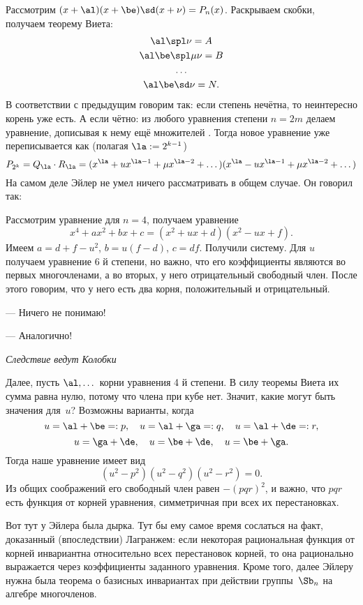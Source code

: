 \documentclass[a4paper,oneside,fleqn,10pt]{article}
\begin{document}
Рассмотрим $(x + \al)(x + \be)\sd(x+\nu) = P_n(x)$.
Раскрываем скобки, получаем теорему Виета:
\begin{gather*}
\al \spl \nu = A\\
\al\be \spl \mu\nu = B\\
\ldots\\
\al\be\sd\nu  = N.
\end{gather*}
В соответствии с предыдущим говорим так:
если степень нечётна, то неинтересно корень уже есть.
А если чётно: из любого уравнения степени $n = 2m$ делаем уравнение, дописывая
к нему ещё множителей . Тогда новое уравнение уже переписывается
как (полагая $\la := 2^{k-1}$)
$$
  P_{2^k} = Q_\la \cdot R_\la=
  (x^\la + u x^{\la-1} + \mu x^{\la-2} + \dots)(x^\la - u x^{\la-1} + \mu x^{\la-2}+\dots )
$$
На самом деле Эйлер не умел ничего рассматривать в общем случае. Он говорил так:

Рассмотрим уравнение для $n=4$, получаем уравнение
$$
  x^4 + ax^2 + bx + c = (x^2 + ux + d) (x^2 - ux + f).
$$
Имеем $a = d + f - u^2$, $b = u(f-d)$, $c = df$.
Получили систему. Для $u$ получаем уравнение 6 й степени, но важно, что его коэффициенты
являются во первых многочленами, а во вторых, у него отрицательный свободный член.
После этого говорим, что у него есть два корня, положительный и отрицательный.

\epigraph{\par--- Ничего не понимаю!
  \par --- Аналогично!}
{\emph{Следствие ведут Колобки}}

Далее, пусть $\al, \dots$ корни уравнения 4 й степени. В силу теоремы Виета их сумма равна нулю,
потому что члена при кубе нет. Значит, какие могут быть значения для~$u$?
Возможны варианты, когда
$$
u = \al + \be =:p,\quad
u = \al + \ga=:q,\quad
u = \al + \de=:r,
$$
$$
u = \ga + \de,\quad
u = \be + \de,\quad
u = \be + \ga.$$
Тогда наше уравнение
имеет вид
$$
  (u^2-p^2)(u^2-q^2)(u^2-r^2) = 0.
$$
Из общих соображений его свободный член равен $-(pqr)^2$, и важно, что
$pqr$ есть функция от корней уравнения, симметричная при всех их перестановках.

Вот тут у Эйлера была дырка. Тут бы ему самое время сослаться на факт, доказанный (впоследствии)
Лагранжем: если некоторая рациональная функция от корней инвариантна относительно всех перестановок корней,
то она рационально выражается через коэффициенты заданного уравнения.
Кроме того, далее Эйлеру нужна была теорема о базисных инвариантах при
действии группы~$\Sb_n$ на алгебре многочленов.
\end{document}
